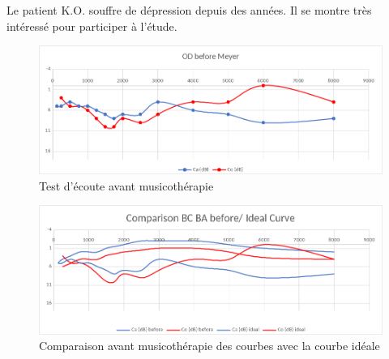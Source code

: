 \begin{enumerate}
 	Le patient K.O. souffre de dépression depuis des années. Il se montre très
        intéressé pour participer à l'étude.
 
 	
 	\begin{figure}[tbh]
 		\centering
 		\includegraphics[width=0.7\linewidth]{images/clinique/od_before_meyer.png}
 		\caption{Test d'écoute avant musicothérapie}
 		\label{fig:odbeforemeyer}
 	\end{figure}
 	

	
 	\begin{figure}
 		\centering
 		\includegraphics[width=0.7\linewidth]{images/clinique/comparison_bc_ba_before_vs_ideal_curve_meyer.png}
 		\caption[Comparaison avec la courbe idéale]{Comparaison avant
                  musicothérapie des
                  courbes  avec la courbe idéale}
 		\label{fig:comparisonbcbabeforevsidealcurvemeyer}
 	\end{figure}


	

\end{enumerate}
